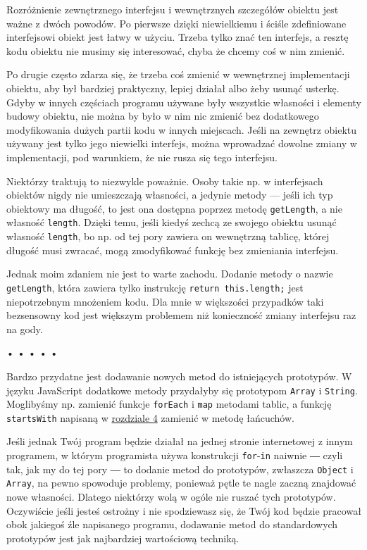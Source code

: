   
Rozróżnienie zewnętrznego interfejsu i wewnętrznych szczegółów obiektu jest ważne z dwóch powodów. Po pierwsze dzięki niewielkiemu i ściśle zdefiniowane interfejsowi obiekt jest łatwy w użyciu. Trzeba tylko znać ten interfejs, a resztę kodu obiektu nie musimy się interesować, chyba że chcemy coś w nim zmienić.

  
Po drugie często zdarza się, że trzeba coś zmienić w wewnętrznej implementacji obiektu, aby był bardziej praktyczny, lepiej działał albo żeby usunąć usterkę. Gdyby w innych częściach programu używane były wszystkie własności i elementy budowy obiektu, nie można by było w nim nic zmienić bez dodatkowego modyfikowania dużych partii kodu w innych miejscach. Jeśli na zewnętrz obiektu używany jest tylko jego niewielki interfejs, można wprowadzać dowolne zmiany w implementacji, pod warunkiem, że nie rusza się tego interfejsu.

  
Niektórzy traktują to niezwykle poważnie. Osoby takie np. w interfejsach obiektów nigdy nie umieszczają własności, a jedynie metody — jeśli ich typ obiektowy ma długość, to jest ona dostępna poprzez metodę \texttt{getLength}, a nie własność \texttt{length}. Dzięki temu, jeśli kiedyś zechcą ze swojego obiektu usunąć własność \texttt{length}, bo np. od tej pory zawiera on wewnętrzną tablicę, której długość musi zwracać, mogą zmodyfikować funkcję bez zmieniania interfejsu.

  
Jednak moim zdaniem nie jest to warte zachodu. Dodanie metody o nazwie \texttt{getLength}, która zawiera tylko instrukcję \texttt{return this.length;} jest niepotrzebnym mnożeniem kodu. Dla mnie w większości przypadków taki bezsensowny kod jest większym problemem niż konieczność zmiany interfejsu raz na gody.



\begin{center}
• • • • •
\end{center}

  
Bardzo przydatne jest dodawanie nowych metod do istniejących prototypów. W języku JavaScript dodatkowe metody przydałyby się prototypom \texttt{Array} i \texttt{String}. Moglibyśmy np. zamienić funkcje \texttt{forEach} i \texttt{map} metodami tablic, a funkcję \texttt{startsWith} napisaną w \hyperref[chap:4]{rozdziale 4} zamienić w metodę łańcuchów.

  
Jeśli jednak Twój program będzie działał na jednej stronie internetowej z innym programem, w którym programista używa konstrukcji \texttt{for}-\texttt{in} naiwnie ― czyli tak, jak my do tej pory ― to dodanie metod do prototypów, zwłaszcza \texttt{Object} i \texttt{Array}, na pewno spowoduje problemy, ponieważ pętle te nagle zaczną znajdować nowe własności. Dlatego niektórzy wolą w ogóle nie ruszać tych prototypów. Oczywiście jeśli jesteś ostrożny i nie spodziewasz się, że Twój kod będzie pracował obok jakiegoś źle napisanego programu, dodawanie metod do standardowych prototypów jest jak najbardziej wartościową techniką.



